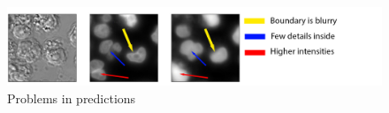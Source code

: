 \begin{figure}[H]
	\begin{center}
		\includegraphics[width=0.8\linewidth]{bilder/nuclei/problems.png}
		\caption{Problems in predictions}\label{fig:nuclei-troubles}
	\end{center}
\end{figure}
